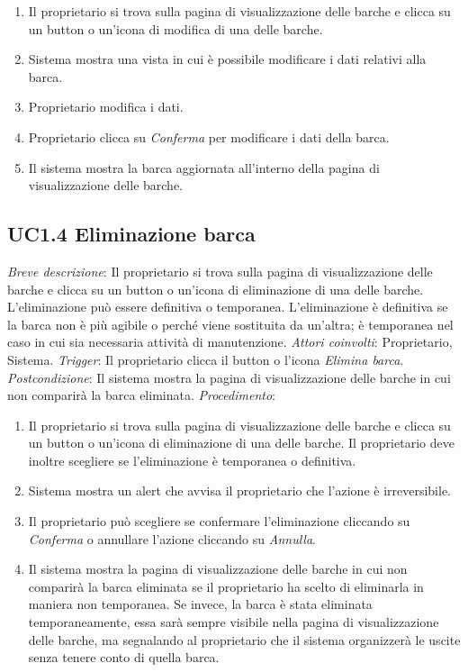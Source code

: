 \begin{enumerate}
    \item Il proprietario si trova sulla pagina di visualizzazione delle barche e clicca su un button o un'icona di modifica di una delle barche.
    \item Sistema mostra una vista in cui è possibile modificare i dati relativi alla barca.
    \item Proprietario modifica i dati.
    \item Proprietario clicca su \textit{Conferma} per modificare i dati della barca.
    \item Il sistema mostra la barca aggiornata all'interno della pagina di visualizzazione delle barche.
\end{enumerate}

\subsection{UC1.4 Eliminazione barca}

\noindent \emph{Breve descrizione}: Il proprietario si trova sulla pagina di visualizzazione delle barche e clicca su un button o un'icona di eliminazione di una delle barche.
L'eliminazione può essere definitiva o temporanea. L'eliminazione è definitiva se la barca non è più agibile o perché viene sostituita da un'altra;
è temporanea nel caso in cui sia necessaria attività di manutenzione.\medbreak
\noindent \emph{Attori coinvolti}: Proprietario, Sistema.\medbreak
\noindent \emph{Trigger}: Il proprietario clicca il button o l'icona \textit{Elimina barca}.\medbreak
\noindent \emph{Postcondizione}: Il sistema mostra la pagina di visualizzazione delle barche in cui non comparirà la barca eliminata.\medbreak
\noindent \emph{Procedimento}:

\begin{enumerate}
    \item Il proprietario si trova sulla pagina di visualizzazione delle barche e clicca su un button o un'icona di eliminazione di una delle barche. Il proprietario deve inoltre
          scegliere se l'eliminazione è temporanea o definitiva.
    \item Sistema mostra un alert che avvisa il proprietario che l'azione è irreversibile.
    \item Il proprietario può scegliere se confermare l'eliminazione cliccando su \textit{Conferma} o annullare l'azione cliccando su \textit{Annulla}.
    \item Il sistema mostra la pagina di visualizzazione delle barche in cui non comparirà la barca eliminata se il proprietario ha scelto di eliminarla in maniera non temporanea.
          Se invece, la barca è stata eliminata temporaneamente, essa sarà sempre visibile nella pagina di visualizzazione delle barche, ma segnalando al proprietario che il sistema organizzerà
          le uscite senza tenere conto di quella barca.
\end{enumerate}

